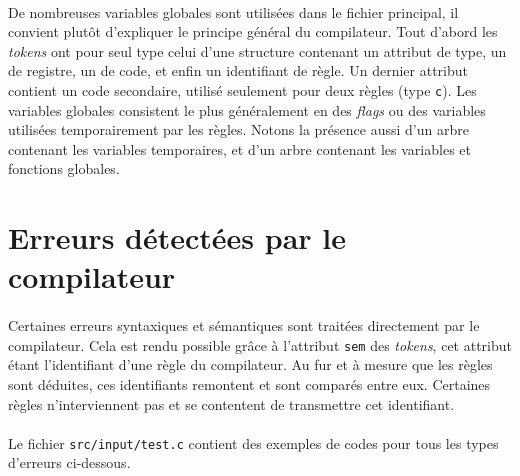 \documentclass[a4paper,10pt]{article}
\begin{document}
\paragraph{}
De nombreuses variables globales sont utilisées dans le fichier principal, il convient plutôt d'expliquer le principe général du compilateur. Tout d'abord les \emph{tokens} ont pour seul type celui d'une structure contenant un attribut de type, un de registre, un de code, et enfin un identifiant de règle. Un dernier attribut contient un code secondaire, utilisé seulement pour deux règles (type \verb!c!). Les variables globales consistent le plus généralement en des \emph{flags} ou des variables utilisées temporairement par les règles. Notons la présence aussi d'un arbre contenant les variables temporaires, et d'un arbre contenant les variables et fonctions globales.

\newpage
\section{Erreurs détectées par le compilateur}

\paragraph{}
Certaines erreurs syntaxiques et sémantiques sont traitées directement par le compilateur. Cela est rendu possible grâce à l'attribut \verb!sem! des \emph{tokens}, cet attribut étant l'identifiant d'une règle du compilateur. Au fur et à mesure que les règles sont déduites, ces identifiants remontent et sont comparés entre eux. Certaines règles n'interviennent pas et se contentent de transmettre cet identifiant.

\paragraph{}
Le fichier \verb!src/input/test.c! contient des exemples de codes pour tous les types d'erreurs ci-dessous.
\end{document}
